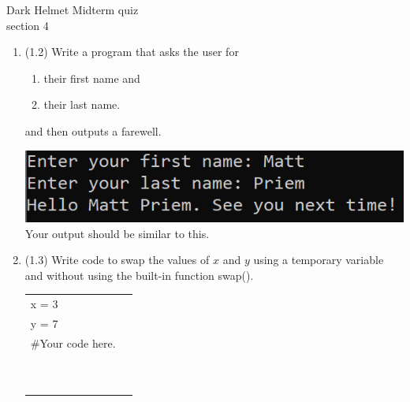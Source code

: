 \documentclass{article}
\begin{document}
\pagebreak
Dark Helmet \hfill Midterm quiz\\
section 4\\
\begin{enumerate}
\item (1.2) 
		Write a program that asks the user for \\
		\begin{minipage}{0.5\textwidth}
		\vspace*{-0.5em}
			\begin{enumerate}  \setlength\itemsep{-0.3em}
				\item their first name and
				\item their last name.  
			\end{enumerate} \vspace*{-1ex}
		and then outputs a farewell.
		\end{minipage}
		\begin{minipage}{0.5\textwidth}
			\centering
			\includegraphics[scale=0.9]{./imgs/outputFarewell.png}\\
			Your output should be similar to this.
		\end{minipage}



\item (1.3) 
		Write code to swap the values of $x$ and $y$ using a temporary variable and without using
		the built-in function swap().\\		
		\begin{tabular}{|ll}
			\\			
			x = 3\\
			y = 7\\[5pt]
			\#Your code here. \\[5pt]
			& \\ & \\ & \\ & \\ & \\ & \\ & \\ & \\ & \\ & \\ 
		\end{tabular}



\end{enumerate}
\end{document}
